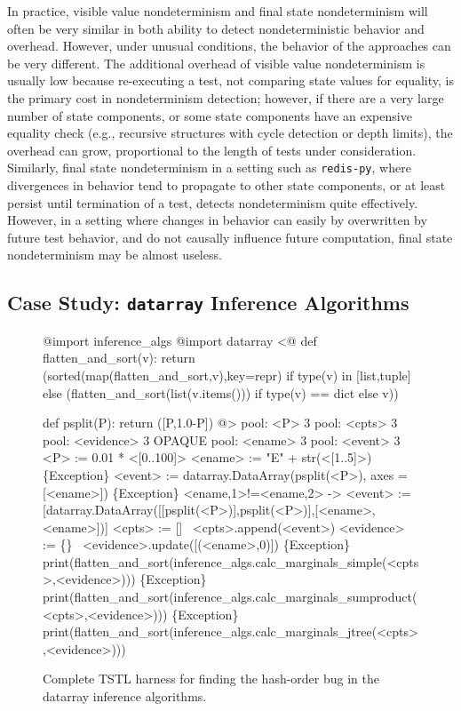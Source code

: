 In practice, visible value nondeterminism and final state
nondeterminism will often be very similar in both ability to detect
nondeterministic behavior and overhead.  However, under unusual
conditions, the behavior of the approaches can be very different.  The
additional overhead of visible value nondeterminism is usually low
because re-executing a test, not comparing state values for equality, is
the primary cost in nondeterminism detection; however, if there are a
very large number of state components, or some state components have
an expensive equality check (e.g., recursive structures with cycle
detection or depth limits), the overhead can grow, proportional to the
length of tests under consideration.  Similarly, final state
nondeterminism in a setting such as {\tt redis-py}, where divergences
in behavior tend to propagate to other state components, or at least
persist until termination of a test, detects nondeterminism quite
effectively.  However, in a setting where changes in behavior can
easily by overwritten by future test behavior, and do not causally
influence future computation, final state nondeterminism may be almost useless.

\subsection{Case Study: {\tt datarray} Inference Algorithms}


\begin{figure}
{\scriptsize
\begin{code}
@import inference\_algs
@import datarray
\vspace{0.1in}
<@
def flatten\_and\_sort(v):
    return (sorted(map(flatten\_and\_sort,v),key=repr) if type(v) in [list,tuple] else
                (flatten\_and\_sort(list(v.items())) if type(v) == dict else v))

def psplit(P):
    return ([P,1.0-P])
@>
\vspace{0.1in}
pool: <P> 3
pool: <cpts> 3
pool: <evidence> 3 OPAQUE
pool: <ename> 3
pool: <event> 3
\vspace{0.1in}
<P> := 0.01 * <[0..100]>
<ename> := "E" + str(<[1..5]>)
\{Exception\} <event> := datarray.DataArray(psplit(<P>), axes = [<ename>])
\{Exception\} <ename,1>!=<ename,2> -> <event> := [datarray.DataArray([[psplit(<P>)],psplit(<P>)],[<ename>,<ename>])]
<cpts> := []
~<cpts>.append(<event>)
<evidence> := \{\}
~<evidence>.update([(<ename>,0)])
\vspace{0.1in}
\{Exception\} print(flatten\_and\_sort(inference\_algs.calc\_marginals\_simple(<cpts>,<evidence>)))
\{Exception\} print(flatten\_and\_sort(inference\_algs.calc\_marginals\_sumproduct(<cpts>,<evidence>)))
\{Exception\} print(flatten\_and\_sort(inference\_algs.calc\_marginals\_jtree(<cpts>,<evidence>)))
\end{code}
}
\caption {Complete TSTL harness for finding the hash-order bug in the datarray
  inference algorithms.}
\label{hashbug}
\end{figure}

